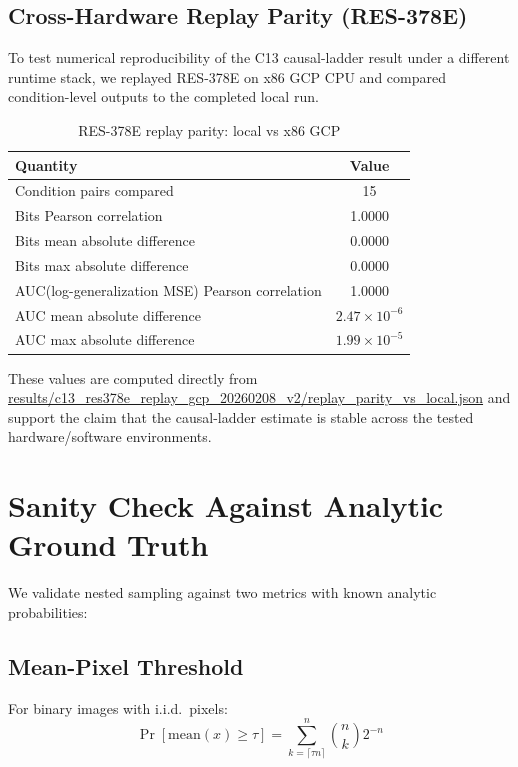 \subsection{Cross-Hardware Replay Parity (RES-378E)}
\label{app:res378e_replay_parity}

To test numerical reproducibility of the C13 causal-ladder result under a different runtime stack, we replayed RES-378E on x86 GCP CPU and compared condition-level outputs to the completed local run.

\begin{table}[H]
\centering
\caption{RES-378E replay parity: local vs x86 GCP}
\label{tab:res378e_replay_parity}
\begin{tabular}{lc}
\toprule
Quantity & Value \\
\midrule
Condition pairs compared & 15 \\
Bits Pearson correlation & 1.0000 \\
Bits mean absolute difference & 0.0000 \\
Bits max absolute difference & 0.0000 \\
AUC(log-generalization MSE) Pearson correlation & 1.0000 \\
AUC mean absolute difference & $2.47\times10^{-6}$ \\
AUC max absolute difference & $1.99\times10^{-5}$ \\
\bottomrule
\end{tabular}
\end{table}

These values are computed directly from
\url{results/c13_res378e_replay_gcp_20260208_v2/replay_parity_vs_local.json}
and support the claim that the causal-ladder estimate is stable across the tested hardware/software environments.




\section{Sanity Check Against Analytic Ground Truth}
\label{app:sanity}

We validate nested sampling against two metrics with known analytic probabilities:

\subsection{Mean-Pixel Threshold}

For binary images with i.i.d.\ pixels:
\begin{equation}
\Pr[\text{mean}(x) \geq \tau] = \sum_{k=\lceil \tau n \rceil}^{n} \binom{n}{k} 2^{-n}
\end{equation}

